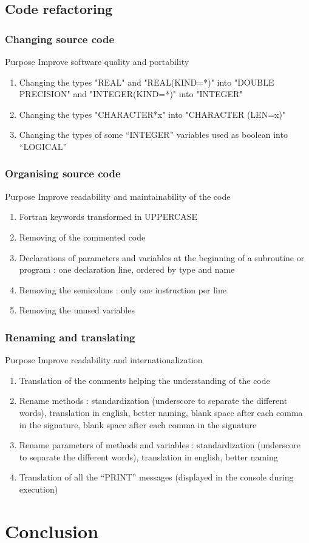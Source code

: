 \documentclass[10p]{beamer}
\begin{document}
\subsection{Code refactoring}
\begin{frame}
\frametitle{Changing source code}
\begin{block}{Purpose}
Improve software quality and portability
\end{block}
\begin{enumerate}
\item Changing the types "REAL" and "REAL(KIND=*)" into "DOUBLE PRECISION" and "INTEGER(KIND=*)" into "INTEGER"
\item Changing the types "CHARACTER*x" into "CHARACTER (LEN=x)"
\item Changing the types of some “INTEGER” variables used as boolean into “LOGICAL”
\end{enumerate}
\end{frame}
\begin{frame}
\frametitle{Organising source code}
\begin{block}{Purpose}
Improve readability and maintainability of the code
\end{block}
\begin{enumerate}
\item Fortran keywords transformed in UPPERCASE
\item Removing of the commented code
\item Declarations of parameters and variables at the beginning of a subroutine or program : one declaration line, ordered by type and name
\item Removing the semicolons : only one instruction per line
\item Removing the unused variables
\end{enumerate}
\end{frame}
\begin{frame}
\frametitle{Renaming and translating}
\begin{block}{Purpose}
Improve readability and internationalization
\end{block}
\begin{enumerate}
\item Translation of the comments helping the understanding of the code
\item Rename methods : standardization (underscore to separate the different words), translation in english, better naming, blank space after each comma in the signature, blank space after each comma in the signature
\item Rename parameters of methods and variables : standardization (underscore to separate the different words), translation in english, better naming
\item Translation of all the “PRINT” messages (displayed in the console during execution)
\end{enumerate}
\end{frame}
\section{Conclusion}
\begin{frame}

\end{frame}
\end{document}
